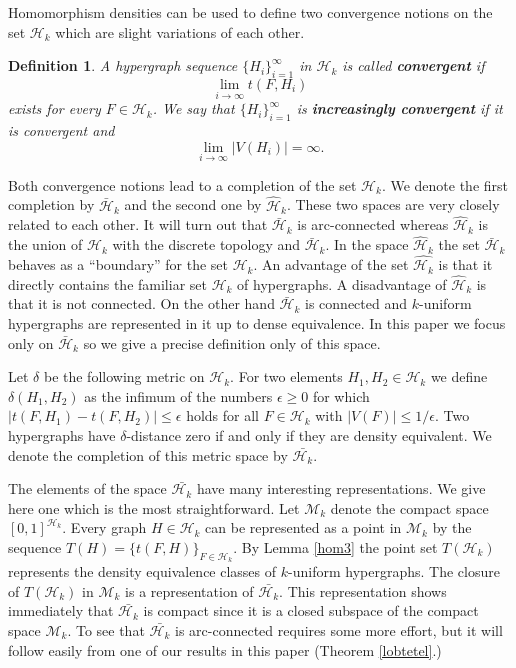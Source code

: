 \documentclass [11pt] {article}
\newtheorem{definition}{Definition}[section]
\def\to{\rightarrow}
\begin{document}
Homomorphism densities can be used to define two convergence
 notions on the set $\mathcal{H}_k$ which are slight variations of each other.

\begin{definition}A hypergraph sequence $\{H_i\}_{i=1}^\infty$ in
  $\mathcal{H}_k$ is called {\bf convergent} if $$\lim_{i\to\infty}t(F,H_i)$$
  exists
for every $F\in\mathcal{H}_k$. We say that $\{H_i\}_{i=1}^\infty$ is {\bf
  increasingly convergent} if it is convergent and
$$\lim_{i\to\infty}|V(H_i)|=
\infty.$$
\end{definition}

Both convergence notions lead to a completion of the set $\mathcal{H}_k$. We
denote the first completion by $\bar{\mathcal{H}}_k$ and the second one by
$\hat{\mathcal{H}}_k$. These two spaces are very closely related to each
other. It will turn out that $\bar{\mathcal{H}}_k$ is arc-connected whereas
$\hat{\mathcal{H}}_k$ is the union of $\mathcal{H}_k$ with the discrete
topology and $\bar{\mathcal{H}}_k$. In the space $\hat{\mathcal{H}}_k$ the set
$\bar{\mathcal{H}}_k$ behaves as a ``boundary'' for the set
$\mathcal{H}_k$. An advantage of the set $\hat{\mathcal{H}_k}$ is that it
directly contains the familiar set $\mathcal{H}_k$ of hypergraphs. A
disadvantage of $\hat{\mathcal{H}}_k$ is that it is not connected.
On the other hand $\bar{\mathcal{H}}_k$ is connected and $k$-uniform
hypergraphs are represented in it up to dense equivalence. In this paper we
focus only on $\bar{\mathcal{H}}_k$ so we give a
 precise definition only of this space.

Let $\delta$ be the following metric on $\mathcal{H}_k$.
 For two elements $H_1,H_2\in\mathcal{H}_k$ we define $\delta(H_1,H_2)$ as the
 infimum of the numbers $\epsilon\geq 0$ for
which $|t(F,H_1)-t(F,H_2)|\leq\epsilon$ holds for all $F\in\mathcal{H}_k$ with
$|V(F)|\leq 1/\epsilon$. Two hypergraphs have
$\delta$-distance zero if and only if they are density equivalent.
We denote the completion of this metric space by $\bar{\mathcal{H}_k}$.

The elements of the space $\bar{\mathcal{H}_k}$ have many interesting
representations. We give here one which is the most straightforward.
 Let $\mathcal{M}_k$ denote the compact space $[0,1]^{\mathcal{H}_k}$. Every
 graph $H\in\mathcal{H}_k$ can be represented as a point in
$\mathcal{M}_k$ by the sequence $T(H)=\{t(F,H)\}_{F\in\mathcal{H}_k}$. By
Lemma \ref{hom3} the point set $T(\mathcal{H}_k)$ represents
the density equivalence classes of $k$-uniform hypergraphs. The closure of
$T(\mathcal{H}_k)$ in $\mathcal{M}_k$ is a representation of
$\bar{\mathcal{H}_k}$. This representation shows immediately that
$\bar{\mathcal{H}_k}$ is compact since it is a closed subspace of the
compact space $\mathcal{M}_k$. To see that $\bar{\mathcal{H}_k}$ is
arc-connected requires some more effort, but it will follow easily
from one of our results in this paper (Theorem \ref{lobtetel}.)
\end{document}
